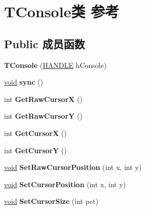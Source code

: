 \hypertarget{class_t_console}{}\section{T\+Console类 参考}
\label{class_t_console}
\subsection*{Public 成员函数}
\begin{DoxyCompactItemize}
\item 
\mbox{\label{class_t_console_af4dfb5c6f56af02019a17f7866fdafc6}} 
{\bfseries T\+Console} (\hyperlink{interfacevoid}{H\+A\+N\+D\+LE} h\+Console)
\item 
\mbox{\label{class_t_console_ab0a1127a7786535038427ea571b07d1a}} 
\hyperlink{interfacevoid}{void} {\bfseries sync} ()
\item 
\mbox{\label{class_t_console_a11e4752f6d8bb39787ff604f20274a21}} 
int {\bfseries Get\+Raw\+CursorX} ()
\item 
\mbox{\label{class_t_console_a42e057a081a00243b1558667747b6de8}} 
int {\bfseries Get\+Raw\+CursorY} ()
\item 
\mbox{\label{class_t_console_a4a60b12c1e9844e9834e919e8bd22c04}} 
int {\bfseries Get\+CursorX} ()
\item 
\mbox{\label{class_t_console_a7c34a6558810094e673f746f1787b998}} 
int {\bfseries Get\+CursorY} ()
\item 
\mbox{\label{class_t_console_ad12acea69cd59d174cbb2b5942538972}} 
\hyperlink{interfacevoid}{void} {\bfseries Set\+Raw\+Cursor\+Position} (int x, int y)
\item 
\mbox{\label{class_t_console_a20392565e5f5660d47597dbb6f575375}} 
\hyperlink{interfacevoid}{void} {\bfseries Set\+Cursor\+Position} (int x, int y)
\item 
\mbox{\label{class_t_console_accb10f615e797565125046ad3f066668}} 
\hyperlink{interfacevoid}{void} {\bfseries Set\+Cursor\+Size} (int pct)

\end{DoxyCompactItemize}
